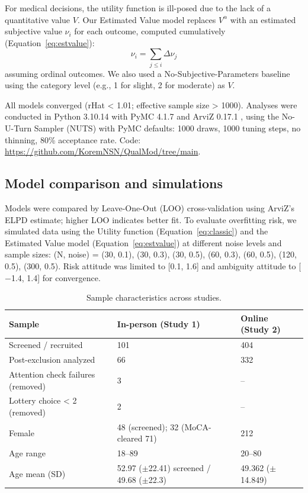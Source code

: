 \documentclass[11pt]{article}
\begin{document}
For medical decisions, the utility function is ill-posed due to the lack of a quantitative value $V$. Our Estimated Value model replaces $V^{\alpha}$ with an estimated subjective value $\nu_i$ for each outcome, computed cumulatively (Equation~\ref{eq:estvalue}):
\begin{equation}
\nu_i = \sum_{j \leq i} \Delta\nu_j
\label{eq:estvalue}
\end{equation}
assuming ordinal outcomes. We also used a No-Subjective-Parameters baseline using the category level (e.g., 1 for slight, 2 for moderate) as $V$.

All models converged (rHat < 1.01; effective sample size > 1000). Analyses were conducted in Python 3.10.14 with PyMC 4.1.7 \cite{salvatier2016pymc} and ArviZ 0.17.1 \cite{kumar2019arviz}, using the No-U-Turn Sampler (NUTS) with PyMC defaults: 1000 draws, 1000 tuning steps, no thinning, 80\% acceptance rate. Code: \url{https://github.com/KoremNSN/QualMod/tree/main}.

\subsection{Model comparison and simulations}
Models were compared by Leave-One-Out (LOO) cross-validation \cite{vehtari2017loo} using ArviZ's ELPD estimate; higher LOO indicates better fit. To evaluate overfitting risk, we simulated data using the Utility function (Equation~\ref{eq:classic}) and the Estimated Value model (Equation~\ref{eq:estvalue}) at different noise levels and sample sizes: (N, noise) = (30, 0.1), (30, 0.3), (30, 0.5), (60, 0.3), (60, 0.5), (120, 0.5), (300, 0.5). Risk attitude was limited to [0.1, 1.6] and ambiguity attitude to [$-$1.4, 1.4] for convergence.

\begin{table}[h]
\centering
\caption{Sample characteristics across studies.}
\begin{tabular}{lll}
\toprule
Sample & In-person (Study 1) & Online (Study 2) \\
\midrule
Screened / recruited & 101 & 404 \\
Post-exclusion analyzed & 66 & 332 \\
Attention check failures (removed) & 3 & -- \\
Lottery choice < 2 (removed) & 2 & -- \\
Female & 48 (screened); 32 (MoCA-cleared 71) & 212 \\
Age range & 18--89 & 20--80 \\
Age mean (SD) & 52.97 ($\pm$22.41) screened / 49.68 ($\pm$22.3) & 49.362 ($\pm$14.849) \\
\bottomrule
\end{tabular}
\end{table}
\end{document}
